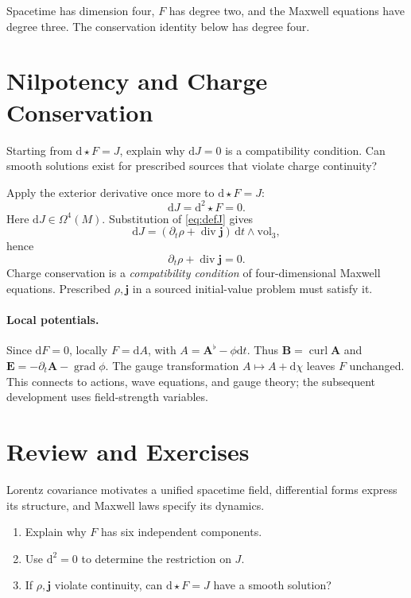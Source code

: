 \documentclass[11pt,openany]{book}
\numberwithin{equation}{chapter}
\theoremstyle{definition}
\theoremstyle{remark}
\newcommand{\dd}{\mathrm d}
\newcommand{\vol}{\mathrm{vol}}
\newcommand{\grad}{\operatorname{grad}}
\newcommand{\Div}{\operatorname{div}}
\newcommand{\curl}{\operatorname{curl}}
\begin{document}
Spacetime has dimension four, $F$ has degree two, and the Maxwell equations have degree three. The conservation identity below has degree four.

\section{Nilpotency and Charge Conservation}
\begin{checkpoint}
Starting from $\dd\star F=J$, explain why $\dd J=0$ is a compatibility condition. Can smooth solutions exist for prescribed sources that violate charge continuity?
\end{checkpoint}
Apply the exterior derivative once more to $\dd\star F=J$:
\begin{equation}\label{eq:dJ}
\dd J=\dd^2\star F=0.
\end{equation}
Here $\dd J\in\Omega^4(M)$. Substitution of \eqref{eq:defJ} gives
\begin{equation}
\dd J=(\partial_t\rho+\Div\bm j)\,
\dd t\wedge\vol_3,
\end{equation}
hence
\begin{equation}\label{eq:continuity}
\boxed{\partial_t\rho+\Div\bm j=0.}
\end{equation}
Charge conservation is a \emph{compatibility condition} of four-dimensional Maxwell equations. Prescribed $\rho,\bm j$ in a sourced initial-value problem must satisfy it.

\paragraph{Local potentials.}
Since $\dd F=0$, locally $F=\dd A$, with $A=\bm A^\flat-\phi\dd t$. Thus $\bm B=\curl\bm A$ and $\bm E=-\partial_t\bm A-\grad\phi$. The gauge transformation $A\mapsto A+\dd\chi$ leaves $F$ unchanged. This connects to actions, wave equations, and gauge theory; the subsequent development uses field-strength variables.

\section{Review and Exercises}
Lorentz covariance motivates a unified spacetime field, differential forms express its structure, and Maxwell laws specify its dynamics.
\begin{enumerate}
\item Explain why $F$ has six independent components.
\item Use $\dd^2=0$ to determine the restriction on $J$.
\item If $\rho,\bm j$ violate continuity, can $\dd\star F=J$ have a smooth solution?
\end{enumerate}
\end{document}
